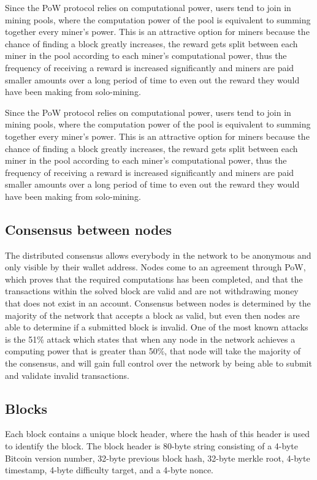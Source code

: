 \documentclass[runningheads]{llncs}
\begin{document}
Since the PoW protocol relies on computational power, users tend to join in mining pools, where the computation power of the pool is equivalent to summing together every miner’s power. This is an attractive option for miners because the chance of finding a block greatly increases, the reward gets split between each miner in the pool according to each miner’s computational power, thus the frequency of receiving a reward is increased significantly and miners are paid smaller amounts over a long period of time to even out the reward they would have been making from solo-mining.


Since the PoW protocol relies on computational power, users tend to join in mining pools, where the computation power of the pool is equivalent to summing together every miner’s power. This is an attractive option for miners because the chance of finding a block greatly increases, the reward gets split between each miner in the pool according to each miner’s computational power, thus the frequency of receiving a reward is increased significantly and miners are paid smaller amounts over a long period of time to even out the reward they would have been making from solo-mining.

\subsection{Consensus between nodes}
The distributed consensus allows everybody in the network to be anonymous and only visible by their wallet address. Nodes come to an agreement through PoW, which proves that the required computations has been completed, and that the transactions within the solved block are valid and are not withdrawing money that does not exist in an account. Consensus between nodes is determined by the majority of the network that accepts a block as valid, but even then nodes are able to determine if a submitted block is invalid. One of the most known attacks is the 51\% attack which states that when any node in the network achieves a computing power that is greater than 50\%, that node will take the majority of the consensus, and will gain full control over the network by being able to submit and validate invalid transactions. 

\subsection{Blocks}
Each block contains a unique block header, where the hash of this header is used to identify the block. The block header is 80-byte string consisting of a 4-byte Bitcoin version number, 32-byte previous block hash, 32-byte merkle root, 4-byte timestamp, 4-byte difficulty target, and a 4-byte nonce.
\end{document}
